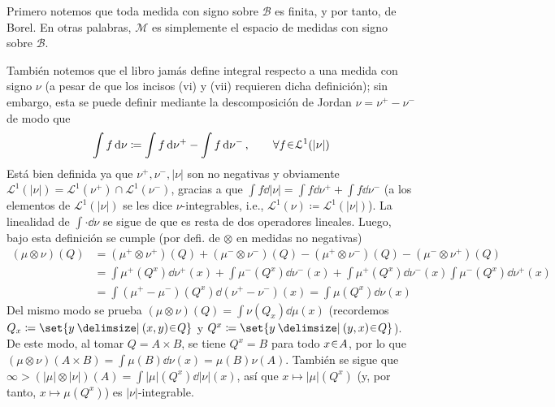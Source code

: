 \begin{sol}
Primero notemos que toda medida con signo sobre $\mathcal{B}$ es finita, y por tanto, de Borel. En otras palabras, $\mathcal{M}$ es simplemente el espacio de medidas con signo sobre $\mathcal{B}$.

También notemos que el libro jamás define integral respecto a una medida con signo $\nu$ (a pesar de que los incisos (vi) y (vii) requieren dicha definición); sin embargo, esta se puede definir mediante la descomposición de Jordan $\nu = \nu^+-\nu^-$ de modo que
\[
\int f \dd{\nu} \coloneq \int f\dd{\nu^+} - \int f \dd{\nu^-},
\qquad\forall f\en \mathcal{L}^1(|\nu|)
\]
Está bien definida ya que $\nu^+,\nu^-,|\nu|$ son no negativas y obviamente $\mathcal{L}^1(|\nu|) = \mathcal{L}^1(\nu^+) \cap \mathcal{L}^1(\nu^-)$,
gracias a que $\int f \dd{|\nu|} = \int f \dd{\nu^+} + \int f \dd{\nu^-}$ (a los elementos de $\mathcal{L}^1(|\nu|)$ se les dice $\nu$-integrables, i.e., $\mathcal{L}^1(\nu) \coloneq \mathcal{L}^1(|\nu|)$). La linealidad de $\int {\cdot}\dd{\nu}$ se sigue de que es resta de dos operadores lineales. Luego, bajo esta definición se cumple (por defi. de $\otimes$ en medidas no negativas)
\begin{align*}
(\mu\otimes\nu)(Q)
&=(\mu^+ \otimes \nu^+)(Q) + (\mu^- \otimes \nu^-)(Q) - (\mu^+ \otimes \nu^-)(Q) - (\mu^- \otimes \nu^+)(Q)\\
&= \int \mu^+(Q^x)\dd{\nu^+(x)} +\int \mu^-(Q^x)\dd{\nu^-(x)} + \int \mu^+(Q^x)\dd{\nu^-(x)} \int \mu^-(Q^x)\dd{\nu^+(x)} \\
&= \int (\mu^+-\mu^-)(Q^x) \dd{(\nu^+-\nu^-)(x)}
= \int \mu(Q^x) \dd{\nu(x)}
\end{align*}
Del mismo modo se prueba $(\mu\otimes\nu)(Q) = \int \nu(Q_x) \dd{\mu(x)}$
(recordemos $Q_x\coloneq\set{y\given (x,y)\en Q}$ y $Q^x\coloneq\set{y\given (y,x)\en Q}$). De este modo, al tomar $Q = A \times B$, se tiene $Q^x = B$ para todo $x\en A$, por lo que $(\mu\otimes\nu)(A\times B) = \int \mu(B)\dd{\nu(x)} = \mu(B)\nu(A)$. También se sigue que $\infty > (|\mu| \otimes|\nu|)(A) = \int |\mu|(Q^x) \dd{|\nu|(x)}$, así que $x \mapsto |\mu|(Q^x)$ (y, por tanto, $x \mapsto \mu(Q^x)$) es $|\nu|$-integrable.

\medskip


\end{sol}
